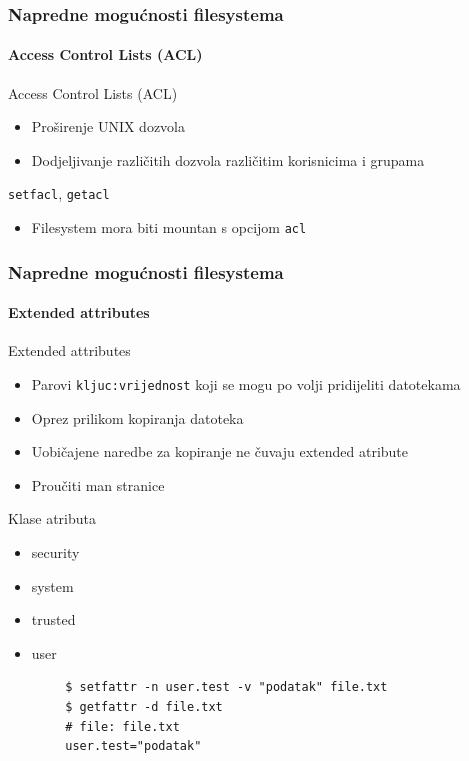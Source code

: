 \documentclass[t]{beamer}
\begin{document}
\begin{frame}
	\frametitle{Napredne mogućnosti filesystema}
	\framesubtitle{Access Control Lists (ACL)}
	Access Control Lists (ACL)
	\begin{itemize}
		\item Proširenje UNIX dozvola
		\item Dodjeljivanje različitih dozvola različitim korisnicima i grupama
	\end{itemize}
	\vspace{1em}
	\texttt{setfacl}, \texttt{getacl}
	\vspace{1em}
	\begin{itemize}
		\item Filesystem mora biti mountan s opcijom \texttt{acl}
	\end{itemize}
\end{frame}

\begin{frame}[fragile]
	\frametitle{Napredne mogućnosti filesystema}
	\framesubtitle{Extended attributes}
	Extended attributes
	\begin{itemize}
		\item Parovi \texttt{kljuc:vrijednost} koji se mogu po volji pridijeliti datotekama
		\item Oprez prilikom kopiranja datoteka
		\item[] Uobičajene naredbe za kopiranje ne čuvaju extended atribute
		\item Proučiti man stranice
	\end{itemize}
	\vspace{1em}
	Klase atributa
	\begin{multicols}{2}
		\begin{itemize}
			\item security
			\item system
			\item trusted
			\item user
		\end{itemize}
	\end{multicols}
	{\footnotesize \begin{verbatim}
		$ setfattr -n user.test -v "podatak" file.txt
		$ getfattr -d file.txt
		# file: file.txt
		user.test="podatak"
		\end{verbatim}}
\end{frame}
\end{document}
